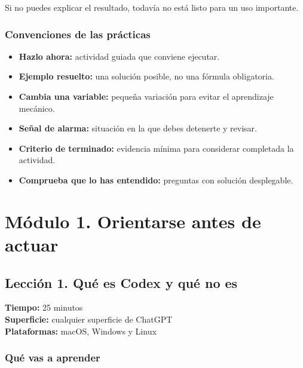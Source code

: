 \documentclass[10pt,a4paper,openany]{book}
\providecommand{\tightlist}{\setlength{\itemsep}{0.18em}\setlength{\parskip}{0pt}}
\begin{document}
Si no puedes explicar el resultado, todavía no está listo para un uso
importante.

\subsection{Convenciones de las
prácticas}\label{convenciones-de-las-pruxe1cticas}

\begin{itemize}
\tightlist
\item
  \textbf{Hazlo ahora:} actividad guiada que conviene ejecutar.
\item
  \textbf{Ejemplo resuelto:} una solución posible, no una fórmula
  obligatoria.
\item
  \textbf{Cambia una variable:} pequeña variación para evitar el
  aprendizaje mecánico.
\item
  \textbf{Señal de alarma:} situación en la que debes detenerte y
  revisar.
\item
  \textbf{Criterio de terminado:} evidencia mínima para considerar
  completada la actividad.
\item
  \textbf{Comprueba que lo has entendido:} preguntas con solución
  desplegable.
\end{itemize}

\chapter{Módulo 1. Orientarse antes de
actuar}\label{muxf3dulo-1.-orientarse-antes-de-actuar}

\clearpage

\section{Lección 1. Qué es Codex y qué no
es}\label{lecciuxf3n-1.-quuxe9-es-codex-y-quuxe9-no-es}

\begin{metabox}

\textbf{Tiempo:} 25 minutos\\
\textbf{Superficie:} cualquier superficie de ChatGPT\\
\textbf{Plataformas:} macOS, Windows y Linux

\end{metabox}

\subsection{Qué vas a aprender}\label{quuxe9-vas-a-aprender}
\end{document}
